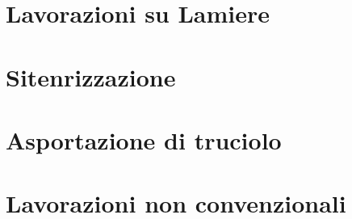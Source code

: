\documentclass[\classfontsize,\papersize,oneside,extrafontsizes]{memoir}
\begin{document}
\prefrontmatter

\cleartoevenpage

\clearforchapter

\clearforchapter

\frontmatter



\clearforchapter
\begingroup
	\hypersetup{hidelinks}
	\tableofcontents
\endgroup
\clearforchapter
\begingroup
	\hypersetup{hidelinks}
	\listoffigures
\endgroup
\clearforchapter
\begingroup
	\hypersetup{hidelinks}
	\listoftables
\endgroup
\clearforchapter
\begingroup
	\hypersetup{hidelinks}
	\mylistoftodos
\endgroup

\mainmatter
\part{Lavorazioni su Lamiere}
\part{Sitenrizzazione}
\part{Asportazione di truciolo}
\part{Lavorazioni non convenzionali}


\appendix
%


\end{document}
